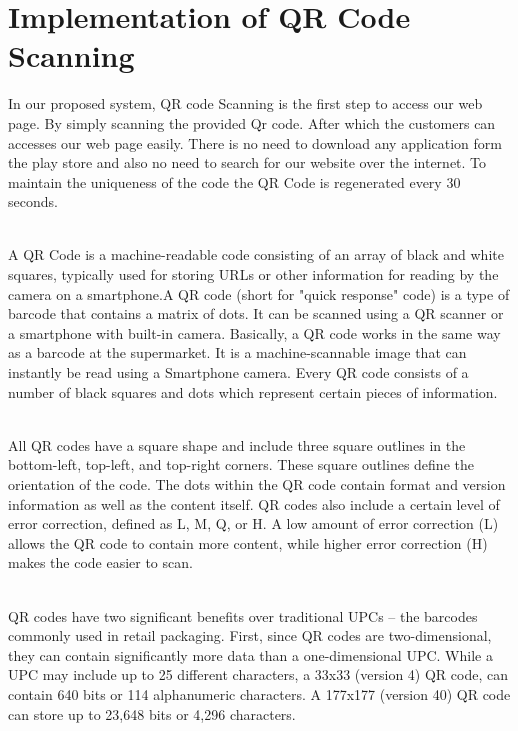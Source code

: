\documentclass[12pt,a4paper]{report}
\begin{document}
\section{Implementation of QR Code Scanning}
\hspace{0.25cm}
\par
In our proposed system, QR code Scanning is the first step to access our web page. By simply
scanning the provided Qr code. After which the customers can accesses our web page
easily. There is no need to download any application form the play store and also no need
to search for our website over the internet. To maintain the uniqueness of the code the QR Code is regenerated every 30 seconds.
\\
\\
\par
A QR Code is a machine-readable code consisting of an array of black and
white squares, typically used for storing URLs or other information for reading by the
camera on a smartphone.A QR code (short for "quick response" code) is a type of
barcode that contains a matrix of dots. It can be scanned using a QR scanner or a
smartphone with built-in camera. Basically, a QR code works in the same way as a
barcode at the supermarket. It is a machine-scannable image that can instantly be read
using a Smartphone camera. Every QR code consists of a number of black squares and
dots which represent certain pieces of information.
\\
\\\par
All QR codes have a square shape and include three square outlines in the bottom-left, top-left, and top-right corners. These square outlines define the orientation of the code. The dots within the QR code contain format and version information as well as the content itself. QR codes also include a certain level of error correction, defined as L, M, Q, or H. A low amount of error correction (L) allows the QR code to contain more content, while higher error correction (H) makes the code easier to scan.
\\
\\
\par
QR codes have two significant benefits over traditional UPCs – the barcodes commonly used in retail packaging. First, since QR codes are two-dimensional, they can contain significantly more data than a one-dimensional UPC. While a UPC may include up to 25 different characters, a 33x33 (version 4) QR code, can contain 640 bits or 114 alphanumeric characters. A 177x177 (version 40) QR code can store up to 23,648 bits or 4,296 characters.
\end{document}
